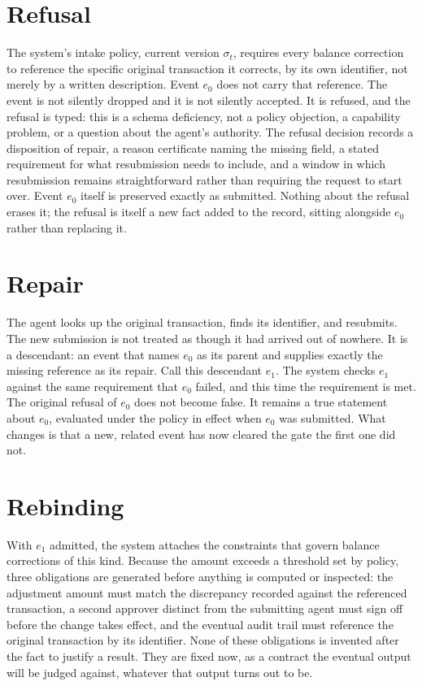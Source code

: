 \documentclass[11pt,openany]{book}
\begin{document}
\section*{Refusal}

The system's intake policy, current version \(\sigma_t\), requires every
balance correction to reference the specific original transaction it corrects,
by its own identifier, not merely by a written description. Event \(e_0\)
does not carry that reference. The event is not silently dropped and it is not
silently accepted. It is refused, and the refusal is typed: this is a schema
deficiency, not a policy objection, a capability problem, or a question about
the agent's authority. The refusal decision records a disposition of repair, a
reason certificate naming the missing field, a stated requirement for what
resubmission needs to include, and a window in which resubmission remains
straightforward rather than requiring the request to start over. Event
\(e_0\) itself is preserved exactly as submitted. Nothing about the refusal
erases it; the refusal is itself a new fact added to the record, sitting
alongside \(e_0\) rather than replacing it.

\section*{Repair}

The agent looks up the original transaction, finds its identifier, and
resubmits. The new submission is not treated as though it had arrived out of
nowhere. It is a descendant: an event that names \(e_0\) as its parent and
supplies exactly the missing reference as its repair. Call this descendant
\(e_1\). The system checks \(e_1\) against the same requirement that
\(e_0\) failed, and this time the requirement is met. The original refusal of
\(e_0\) does not become false. It remains a true statement about \(e_0\),
evaluated under the policy in effect when \(e_0\) was submitted. What changes
is that a new, related event has now cleared the gate the first one did not.

\section*{Rebinding}

With \(e_1\) admitted, the system attaches the constraints that govern balance
corrections of this kind. Because the amount exceeds a threshold set by policy,
three obligations are generated before anything is computed or inspected: the
adjustment amount must match the discrepancy recorded against the referenced
transaction, a second approver distinct from the submitting agent must sign
off before the change takes effect, and the eventual audit trail must reference
the original transaction by its identifier. None of these obligations is
invented after the fact to justify a result. They are fixed now, as a contract
the eventual output will be judged against, whatever that output turns out to
be.
\end{document}
